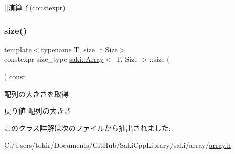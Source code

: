 \mbox{[}\mbox{]}演算子(constexpr) 

\mbox{\label{classsaki_1_1_array_a40cb0e5c23bc649a9e3cb7eaf5fd00ed}} 
\subsubsection{\texorpdfstring{size()}{size()}}
{\footnotesize\ttfamily template$<$typename T, size\+\_\+t Size$>$ \\
constexpr size\+\_\+type \mbox{\hyperlink{classsaki_1_1_array}{saki\+::\+Array}}$<$ T, Size $>$\+::size (\begin{DoxyParamCaption}{ }\end{DoxyParamCaption}) const\hspace{0.3cm}{\ttfamily [inline]}}



配列の大きさを取得 

\begin{DoxyReturn}{戻り値}
配列の大きさ 
\end{DoxyReturn}


このクラス詳解は次のファイルから抽出されました\+:\begin{DoxyCompactItemize}
\item 
C\+:/\+Users/tokir/\+Documents/\+Git\+Hub/\+Saki\+Cpp\+Library/saki/array/\mbox{\hyperlink{array_8h}{array.\+h}}\end{DoxyCompactItemize}
